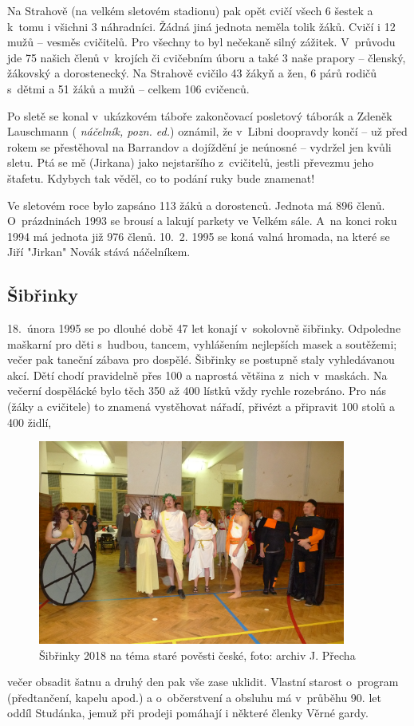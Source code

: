 \documentclass[a5paper, 11pt, twoside]{article}
\newcommand{\pozned}[1]{%
\textit{#1}}
\begin{document}
Na Strahově (na velkém sletovém stadionu) pak opět cvičí všech 6 šestek
a k~tomu i všichni 3 náhradníci. Žádná jiná jednota neměla tolik žáků.
Cvičí i 12 mužů -- vesměs cvičitelů. Pro všechny to byl nečekaně silný
zážitek. V~průvodu jde 75 našich členů v~krojích či cvičebním úboru a
také 3 naše prapory -- členský, žákovský a dorostenecký. Na Strahově
cvičilo 43 žákyň a žen, 6 párů rodičů s~dětmi a 51 žáků a mužů -- celkem
106 cvičenců.

Po sletě se konal v~ukázkovém táboře zakončovací posletový táborák a
Zdeněk Lauschmann (\pozned{náčelník, pozn. ed.}) oznámil, že v~Libni
doopravdy končí -- už před rokem se přestěhoval na Barrandov a dojíždění
je neúnosné -- vydržel jen kvůli sletu. Ptá se mě (Jirkana) jako
nejstaršího z~cvičitelů, jestli převezmu jeho štafetu. Kdybych tak
věděl, co to podání ruky bude znamenat!

Ve sletovém roce bylo zapsáno 113 žáků a dorostenců. Jednota má 896
členů. O~prázdninách 1993 se brousí a lakují parkety ve Velkém sále.
A~na konci roku 1994 má jednota již 976 členů. 10.~2. 1995 se koná valná
hromada, na které se Jiří "Jirkan" Novák stává náčelníkem.

\subsection{Šibřinky}

18.~února 1995 se po dlouhé době 47 let konají v~sokolovně šibřinky.
Odpoledne maškarní pro děti s~hudbou, tancem, vyhlášením nejlepších
masek a soutěžemi; večer pak taneční zábava pro dospělé. Šibřinky se
postupně staly vyhledávanou akcí. Dětí chodí pravidelně přes 100 a
naprostá většina z~nich v~maskách. Na večerní dospělácké bylo těch 350
až 400 lístků vždy rychle rozebráno. Pro nás (žáky a cvičitele) to
znamená vystěhovat nářadí, přivézt a připravit 100 stolů a 400 židlí,
\begin{figure}[h!]
  \centering 
  \includegraphics[width=0.9\textwidth]{img/45_sibrinky.JPG}
  \caption*{Šibřinky 2018 na téma staré pověsti české, foto: archiv J. Přecha}
\end{figure}
večer obsadit šatnu a druhý den pak vše zase uklidit. Vlastní starost
o~program (předtančení, kapelu apod.) a o~občerstvení a obsluhu má
v~průběhu 90. let oddíl Studánka, jemuž při prodeji pomáhají i některé
členky Věrné gardy.
\end{document}
